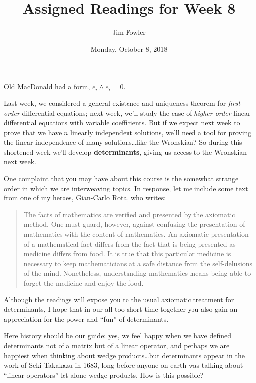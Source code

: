 \documentclass{homework}
\author{Jim Fowler}
\title{Assigned Readings for Week 8}
\date{Monday, October 8, 2018}
\begin{document}
\maketitle

\begin{inspiration}
  Old MacDonald had a form, $e_i \wedge e_i = 0$. 
\end{inspiration}

Last week, we considered a general existence and uniqueness theorem
for \textit{first order} differential equations; next week, we'll
study the case of \textit{higher order} linear differential equations
with variable coefficients.  But if we expect next week to prove that
we have $n$ linearly independent solutions, we'll need a tool for
proving the linear independence of many solutions\ldots like the
Wronskian?  So during this shortened week we'll develop
\textbf{determinants}, giving us access to the Wronskian next week.

One complaint that you may have about this course is the somewhat
strange order in which we are interweaving topics.  In response, let
me include some text from one of my heroes, Gian-Carlo Rota, who
writes:
\begin{quote}
  The facts of mathematics are verified and presented by the axiomatic
  method. One must guard, however, against confusing the presentation
  of mathematics with the content of mathematics. An axiomatic
  presentation of a mathematical fact differs from the fact that is
  being presented as medicine differs from food. It is true that this
  particular medicine is necessary to keep mathematicians at a safe
  distance from the self-delusions of the mind. Nonetheless,
  understanding mathematics means being able to forget the medicine
  and enjoy the food.
\end{quote}
Although the readings will expose you to the usual axiomatic treatment
for determinants, I hope that in our all-too-short time together you
also gain an appreciation for the power and ``fun'' of determinants.

Here history should be our guide: yes, we feel happy when we have
defined determinants not of a matrix but of a linear operator, and
perhaps we are happiest when thinking about wedge products\ldots but
determinants appear in the work of Seki Takakazu in 1683, long before
anyone on earth was talking about ``linear operators'' let alone wedge
products.  How is this possible?

\end{document}
